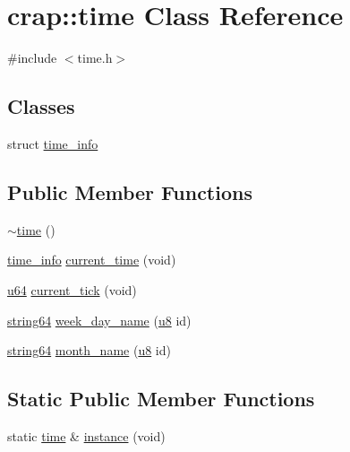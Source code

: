 \hypertarget{classcrap_1_1time}{\section{crap\-:\-:time Class Reference}
\label{classcrap_1_1time}
}


{\ttfamily \#include $<$time.\-h$>$}

\subsection*{Classes}
\begin{DoxyCompactItemize}
\item 
struct \hyperlink{structcrap_1_1time_1_1time__info}{time\-\_\-info}
\end{DoxyCompactItemize}
\subsection*{Public Member Functions}
\begin{DoxyCompactItemize}
\item 
\hyperlink{classcrap_1_1time_a9e759f32d27f43a85c21e496205cbea2}{$\sim$time} ()
\item 
\hyperlink{structcrap_1_1time_1_1time__info}{time\-\_\-info} \hyperlink{classcrap_1_1time_a7ebddc1f0416219b1548b8e5fa65f939}{current\-\_\-time} (void)
\item 
\hyperlink{types_8h_a3f7e2bcbb0b4c338f3c4f6c937cd4234}{u64} \hyperlink{classcrap_1_1time_a8f2b003ac30848e9419e19649ca1b509}{current\-\_\-tick} (void)
\item 
\hyperlink{namespacecrap_a502636a1c5819e8500d07deed797ef9f}{string64} \hyperlink{classcrap_1_1time_a7169f0086d7b43744135268d43b77d90}{week\-\_\-day\-\_\-name} (\hyperlink{types_8h_a92c50087ca0e64fa93fc59402c55f8ca}{u8} id)
\item 
\hyperlink{namespacecrap_a502636a1c5819e8500d07deed797ef9f}{string64} \hyperlink{classcrap_1_1time_a7dffd26830f384f33e53cca0a67358b4}{month\-\_\-name} (\hyperlink{types_8h_a92c50087ca0e64fa93fc59402c55f8ca}{u8} id)
\end{DoxyCompactItemize}
\subsection*{Static Public Member Functions}
\begin{DoxyCompactItemize}
\item 
static \hyperlink{classcrap_1_1time}{time} \& \hyperlink{classcrap_1_1time_a6691ce57d6fd0047d8e6d564b6bca030}{instance} (void)
\end{DoxyCompactItemize}

